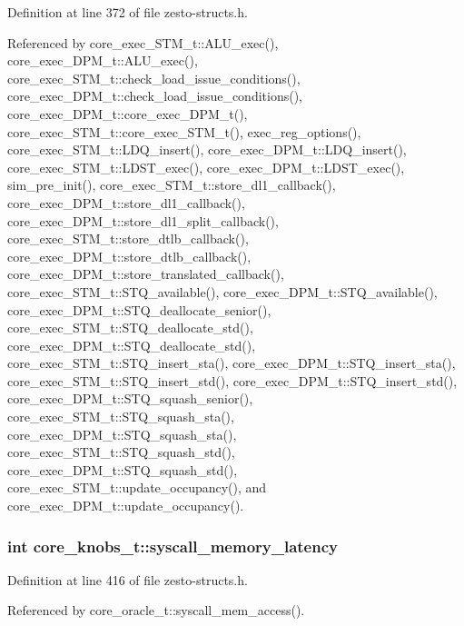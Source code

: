 Definition at line 372 of file zesto-structs.h.

Referenced by core\_\-exec\_\-STM\_\-t::ALU\_\-exec(), core\_\-exec\_\-DPM\_\-t::ALU\_\-exec(), core\_\-exec\_\-STM\_\-t::check\_\-load\_\-issue\_\-conditions(), core\_\-exec\_\-DPM\_\-t::check\_\-load\_\-issue\_\-conditions(), core\_\-exec\_\-DPM\_\-t::core\_\-exec\_\-DPM\_\-t(), core\_\-exec\_\-STM\_\-t::core\_\-exec\_\-STM\_\-t(), exec\_\-reg\_\-options(), core\_\-exec\_\-STM\_\-t::LDQ\_\-insert(), core\_\-exec\_\-DPM\_\-t::LDQ\_\-insert(), core\_\-exec\_\-STM\_\-t::LDST\_\-exec(), core\_\-exec\_\-DPM\_\-t::LDST\_\-exec(), sim\_\-pre\_\-init(), core\_\-exec\_\-STM\_\-t::store\_\-dl1\_\-callback(), core\_\-exec\_\-DPM\_\-t::store\_\-dl1\_\-callback(), core\_\-exec\_\-DPM\_\-t::store\_\-dl1\_\-split\_\-callback(), core\_\-exec\_\-STM\_\-t::store\_\-dtlb\_\-callback(), core\_\-exec\_\-DPM\_\-t::store\_\-dtlb\_\-callback(), core\_\-exec\_\-DPM\_\-t::store\_\-translated\_\-callback(), core\_\-exec\_\-STM\_\-t::STQ\_\-available(), core\_\-exec\_\-DPM\_\-t::STQ\_\-available(), core\_\-exec\_\-DPM\_\-t::STQ\_\-deallocate\_\-senior(), core\_\-exec\_\-STM\_\-t::STQ\_\-deallocate\_\-std(), core\_\-exec\_\-DPM\_\-t::STQ\_\-deallocate\_\-std(), core\_\-exec\_\-STM\_\-t::STQ\_\-insert\_\-sta(), core\_\-exec\_\-DPM\_\-t::STQ\_\-insert\_\-sta(), core\_\-exec\_\-STM\_\-t::STQ\_\-insert\_\-std(), core\_\-exec\_\-DPM\_\-t::STQ\_\-insert\_\-std(), core\_\-exec\_\-DPM\_\-t::STQ\_\-squash\_\-senior(), core\_\-exec\_\-STM\_\-t::STQ\_\-squash\_\-sta(), core\_\-exec\_\-DPM\_\-t::STQ\_\-squash\_\-sta(), core\_\-exec\_\-STM\_\-t::STQ\_\-squash\_\-std(), core\_\-exec\_\-DPM\_\-t::STQ\_\-squash\_\-std(), core\_\-exec\_\-STM\_\-t::update\_\-occupancy(), and core\_\-exec\_\-DPM\_\-t::update\_\-occupancy().
\subsubsection[{syscall\_\-memory\_\-latency}]{\setlength{\rightskip}{0pt plus 5cm}int {\bf core\_\-knobs\_\-t::syscall\_\-memory\_\-latency}}\label{structcore__knobs__t_ad3ab7d73fa5b10b6db7b4892dbbf581}




Definition at line 416 of file zesto-structs.h.

Referenced by core\_\-oracle\_\-t::syscall\_\-mem\_\-access().
